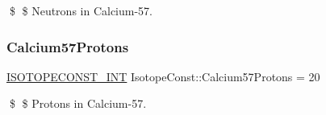 \$ \$ Neutrons in Calcium-\/57. \mbox{\label{group___isotope_const-_calcium-_ca57_ga15d31ee4796833cae297f77ee9920bb7}} 
\subsubsection{\texorpdfstring{Calcium57\+Protons}{Calcium57Protons}}
{\footnotesize\ttfamily \mbox{\hyperlink{group___isotope_const-_macros_ga5f18360b3e99483a35c32d789e62621c}{I\+S\+O\+T\+O\+P\+E\+C\+O\+N\+S\+T\+\_\+\+I\+NT}} Isotope\+Const\+::\+Calcium57\+Protons = 20}

\$ \$ Protons in Calcium-\/57. 